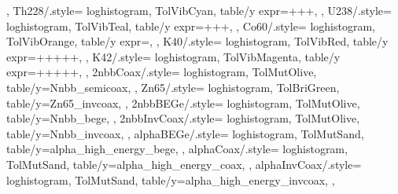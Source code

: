 {{  },
  Th228/.style={%
    loghistogram,
    TolVibCyan,
    table/y expr=+++,
  },
  U238/.style={%
    loghistogram,
    TolVibTeal,
    table/y expr=+++,
  },
  Co60/.style={%
    loghistogram,
    TolVibOrange,
    table/y expr=,
  },
  K40/.style={%
    loghistogram,
    TolVibRed,
    table/y expr=+++++,
  },
  K42/.style={%
    loghistogram,
    TolVibMagenta,
    table/y expr=+++++,
  },
  2nbbCoax/.style={%
    loghistogram,
    TolMutOlive,
    table/y=Nnbb_semicoax,
  },
  Zn65/.style={%
    loghistogram,
    TolBriGreen,
    table/y=Zn65_invcoax,
  },
  2nbbBEGe/.style={%
    loghistogram,
    TolMutOlive,
    table/y=Nnbb_bege,
  },
  2nbbInvCoax/.style={%
    loghistogram,
    TolMutOlive,
    table/y=Nnbb_invcoax,
  },
  alphaBEGe/.style={%
    loghistogram,
    TolMutSand,
    table/y=alpha_high_energy_bege,
  },
  alphaCoax/.style={%
    loghistogram,
    TolMutSand,
    table/y=alpha_high_energy_coax,
  },
  alphaInvCoax/.style={%
    loghistogram,
    TolMutSand,
    table/y=alpha_high_energy_invcoax,
  },
}

\newcommand{\addbrasilianplot}{%
  \addplot[3sigu] table {\loadedtable};
  \addplot[3sigl] table {\loadedtable};
  \addplot[3sigb] fill between [of=3sigu and 3sigl];
  \addplot[2sigu] table {\loadedtable};
  \addplot[2sigl] table {\loadedtable};
  \addplot[2sigb] fill between [of=2sigu and 2sigl];
  \addplot[1sigu] table {\loadedtable};
  \addplot[1sigl] table {\loadedtable};
  \addplot[1sigb] fill between [of=1sigu and 1sigl];
  \addplot[ratio] table {\loadedtable};
}
